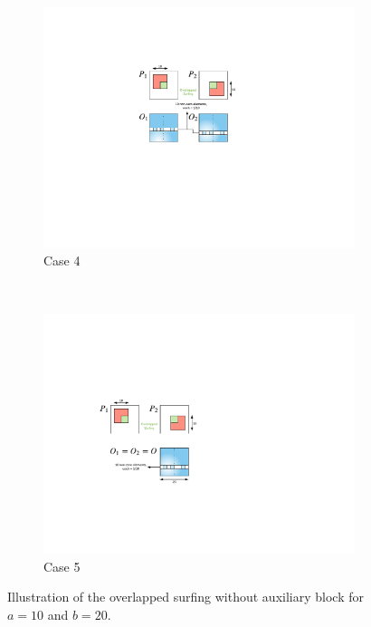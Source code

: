 \documentclass[conference]{IEEEtran}
\begin{document}
	
	\begin{figure}
		\centering
		\begin{subfigure}[b]{0.22\textwidth}
			\includegraphics[width=\textwidth]{./img/case4-2}
			\caption{Case 4}
			\label{fig:case4}
		\end{subfigure}
		~ %
		\begin{subfigure}[b]{0.22\textwidth}
			\includegraphics[width=\textwidth]{./img/case5-2}
			\caption{Case 5}
			\label{fig:case5}
		\end{subfigure}
		\caption{Illustration of the overlapped surfing without auxiliary block for $a = 10$ and $b = 20$.}\label{fig:osurf}
	\end{figure}
	
\end{document}
